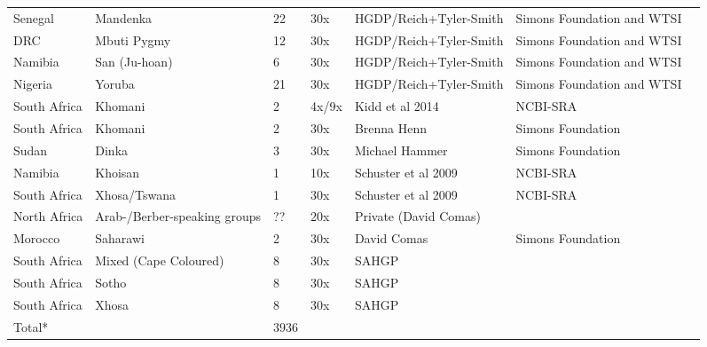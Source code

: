 \begin{landscape}
\begin{longtable}{lllllll}
Senegal & Mandenka & 22 & 30x & HGDP/Reich+Tyler-Smith & Simons Foundation and WTSI \\
DRC & Mbuti Pygmy & 12 & 30x & HGDP/Reich+Tyler-Smith & Simons Foundation and WTSI \\
Namibia & San (Ju-hoan) & 6 & 30x & HGDP/Reich+Tyler-Smith & Simons Foundation and WTSI \\
Nigeria & Yoruba & 21 & 30x & HGDP/Reich+Tyler-Smith & Simons Foundation and WTSI \\
South Africa & Khomani & 2 & 4x/9x & Kidd et al 2014 & NCBI-SRA \\
South Africa & Khomani & 2 & 30x & Brenna Henn & Simons Foundation \\
Sudan & Dinka & 3 & 30x & Michael Hammer & Simons Foundation \\
Namibia & Khoisan & 1 & 10x & Schuster et al 2009 & NCBI-SRA \\
South Africa & Xhosa/Tswana & 1 & 30x & Schuster et al 2009 & NCBI-SRA \\
North Africa & Arab-/Berber-speaking groups & ?? & 20x & Private (David Comas) &  \\
Morocco & Saharawi & 2 & 30x & David Comas & Simons Foundation \\
South Africa & Mixed (Cape Coloured) & 8 & 30x & SAHGP &  \\
South Africa & Sotho & 8 & 30x & SAHGP &  \\
South Africa & Xhosa & 8 & 30x & SAHGP &  \\
Total* &  & 3936 &  &  & 
}
\end{longtable}
\end{landscape}